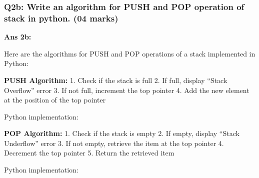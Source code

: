 \hypertarget{q2b-write-an-algorithm-for-push-and-pop-operation-of-stack-in-python.-04-marks}{%
\subsubsection{Q2b: Write an algorithm for PUSH and POP operation of
stack in python. (04
marks)}\label{q2b-write-an-algorithm-for-push-and-pop-operation-of-stack-in-python.-04-marks}}

\textbf{Ans 2b:}

Here are the algorithms for PUSH and POP operations of a stack
implemented in Python:

\textbf{PUSH Algorithm:} 1. Check if the stack is full 2. If full,
display ``Stack Overflow'' error 3. If not full, increment the top
pointer 4. Add the new element at the position of the top pointer

Python implementation:

\begin{Shaded}
\begin{Highlighting}[]
     \OperatorTok{\textgreater{}=}
        \NormalTok{(}
    \NormalTok{:}
        \NormalTok{(}
\end{Highlighting}
\end{Shaded}

\textbf{POP Algorithm:} 1. Check if the stack is empty 2. If empty,
display ``Stack Underflow'' error 3. If not empty, retrieve the item at
the top pointer 4. Decrement the top pointer 5. Return the retrieved
item

Python implementation:

\begin{Shaded}
\begin{Highlighting}[]
     \OperatorTok{==} \NormalTok{:}
        \NormalTok{(}\NormalTok{)}
         
    \NormalTok{:}
\OperatorTok{=}
        \NormalTok{(}
\end{Highlighting}
\end{Shaded}

